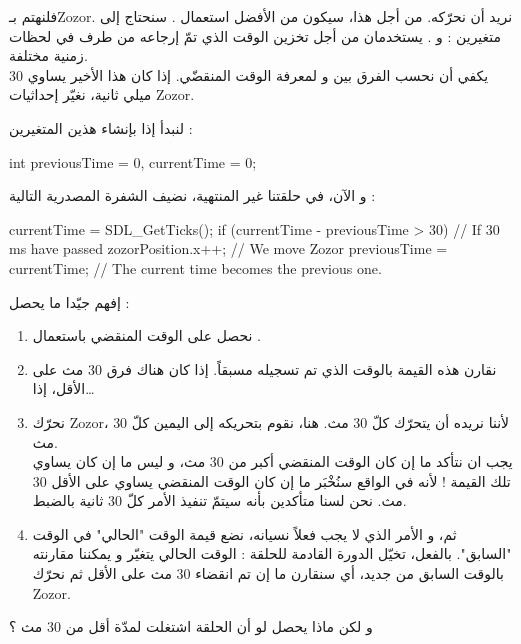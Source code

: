 فلنهتم بـ\textenglish{Zozor}.
نريد أن نحرّكه. من أجل هذا، سيكون من الأفضل استعمال 
.
سنحتاج إلى متغيرين : 
و 
.
يستخدمان من أجل تخزين الوقت الذي تمّ إرجاعه من طرف 
في لحظات زمنية مختلفة.\\
يكفي أن نحسب الفرق بين 
و
لمعرفة الوقت المنقضّي. إذا كان هذا الأخير يساوي 30 ميلي ثانية، نغيّر إحداثيات 
\textenglish{Zozor}.

لنبدأ إذا بإنشاء هذين المتغيرين  :

\begin{Csource}
int previousTime = 0, currentTime = 0;
\end{Csource}

و الآن، في حلقتنا غير المنتهية، نضيف الشفرة المصدرية التالية :

\begin{Csource}
currentTime = SDL_GetTicks();
if (currentTime - previousTime > 30) // If 30 ms have passed
{
	zozorPosition.x++; // We move Zozor
	previousTime = currentTime; // The current time becomes the previous one.
}
\end{Csource}

إفهم جيّدا ما يحصل :

\begin{enumerate}
	\item نحصل على الوقت المنقضي باستعمال
	.
	\item نقارن هذه القيمة بالوقت الذي تم تسجيله مسبقاً. إذا كان هناك فرق 30 مث على الأقل، إذا\dots
	\item نحرّك
	\textenglish{Zozor}،
	لأننا نريده أن يتحرّك كلّ 30 مث. هنا، نقوم بتحريكه إلى اليمين كلّ 30 مث. \\
	يجب ان نتأكد ما إن كان الوقت المنقضي أكبر من 30 مث، و ليس ما إن كان يساوي تلك القيمة ! لأنه في الواقع سنُخْبَر ما إن كان الوقت المنقضي يساوي على الأقل 30 مث. نحن لسنا متأكدين بأنه سيتمّ تنفيذ الأمر كلّ 30 ثانية بالضبط.
	\item ثم، و الأمر الذي لا يجب فعلاً نسيانه، نضع قيمة الوقت "الحالي" في الوقت "السابق". بالفعل، تخيّل الدورة القادمة للحلقة : الوقت الحالي يتغيّر و يمكننا مقارنته بالوقت السابق من جديد، أي سنقارن ما إن تم انقضاء 30 مث على الأقل ثم نحرّك
	\textenglish{Zozor}.
\end{enumerate}

\begin{question}
و لكن ماذا يحصل لو أن الحلقة اشتغلت لمدّة أقل من 30 مث ؟
\end{question}


